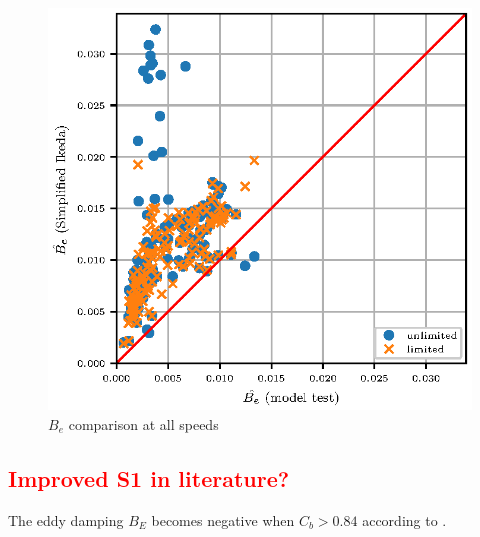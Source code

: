 \begin{figure}[H]
\centering
  \centering
  \includegraphics[width=1.0\columnwidth]{figures/ikeda_limited.eps}
  \caption{$\hat{B_e}$ comparison at all speeds}
  \label{fig:ikeda_limited}
\end{figure}



\textcolor{red}{\subsection{Improved S1 in literature?}}
The eddy damping $ B_E $ becomes negative when $ C_b>0.84 $ according to \parencite[]{rudakovic_application_2017}.

